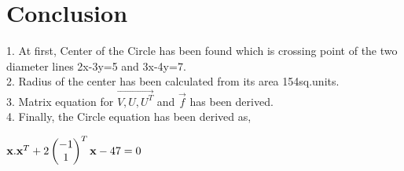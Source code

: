 \documentclass[journal,10pt,twocolumn]{article}
\begin{document}
\section{Conclusion}
\begin{flushleft}
1. At first, Center of the Circle has been found which is crossing point of the two diameter lines 2x-3y=5 and 3x-4y=7.\\
\vspace{0.25cm}
2. Radius of the center has been calculated from its area 154sq.units.\\
\vspace{0.25cm}
3. Matrix equation for $\vec{V, U, U^T}$ and $\vec{f}$ has been derived.\\
\vspace{0.25cm}
4. Finally, the Circle equation has been derived as, \\
\vspace{0.25cm}
\begin{center}
$  \mathbf{x}. \mathbf{x}^T + 2 \begin{pmatrix}-1\\1\end{pmatrix}^T \mathbf{x} -47 = 0$
\end{center}
\end{flushleft}
\end{document}
